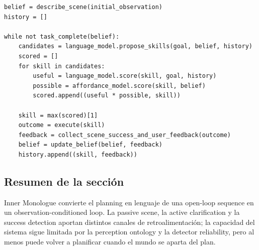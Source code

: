

\begin{lstlisting}[caption={Closed-loop planner de SayCan + Inner Monologue},label={lst:closed-loop-planner}]
belief = describe_scene(initial_observation)
history = []

while not task_complete(belief):
    candidates = language_model.propose_skills(goal, belief, history)
    scored = []
    for skill in candidates:
        useful = language_model.score(skill, goal, history)
        possible = affordance_model.score(skill, belief)
        scored.append((useful * possible, skill))

    skill = max(scored)[1]
    outcome = execute(skill)
    feedback = collect_scene_success_and_user_feedback(outcome)
    belief = update_belief(belief, feedback)
    history.append((skill, feedback))
\end{lstlisting}

\subsection{Resumen de la sección}

Inner Monologue convierte el planning en lenguaje de una open-loop sequence en un observation-conditioned loop. La passive scene, la active clarification y la success detection aportan distintos canales de retroalimentación; la capacidad del sistema sigue limitada por la perception ontology y la detector reliability, pero al menos puede volver a planificar cuando el mundo se aparta del plan.

